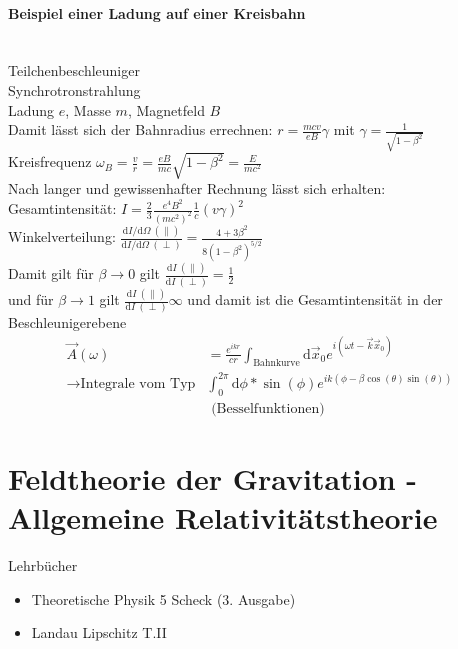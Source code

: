 \documentclass[a4paper]{article}
\begin{document}
\paragraph{Beispiel einer Ladung auf einer Kreisbahn}~\\
Teilchenbeschleuniger\\
Synchrotronstrahlung\\
Ladung $e$, Masse $m$, Magnetfeld $B$\\
Damit lässt sich der Bahnradius errechnen: $r=\frac{mcv}{eB}\gamma$ mit
$\gamma=\frac{1}{\sqrt{1-\beta^2}}$\\
Kreisfrequenz
$\omega_B=\frac{v}{r}=\frac{eB}{mc}\sqrt{1-\beta^2}=\frac{E}{mc^2}$\\
Nach langer und gewissenhafter Rechnung lässt sich erhalten:\\
Gesamtintensität: 
$I=\frac{2}{3}\frac{e^4B^2}{(mc^2)^2}\frac{1}{c}\left(v\gamma\right)^2$\\
Winkelverteilung: $\frac{\mathrm{d}I/\mathrm{d}\Omega\
(\parallel)}{\mathrm{d}I/\mathrm{d}\Omega\
(\perp)}=\frac{4+3\beta^2}{8(1-\beta^2)^{5/2}}$\\
Damit gilt für $\beta\rightarrow0$ gilt $\frac{\mathrm{d}I\
(\parallel)}{\mathrm{d}I \ (\perp)}=\frac{1}{2}$\\
und für $\beta\rightarrow1$ gilt $\frac{\mathrm{d}I\
(\parallel)}{\mathrm{d}I \ (\perp)}\infty$ und damit ist die Gesamtintensität in
der Beschleunigerebene
\begin{align}
\vec{A}(\omega)&=\frac{e^{ikr}}{cr}\int_{\text{Bahnkurve}}\mathrm{d}\vec{x}_0
e^{i(\omega t-\vec{k}\vec{x}_0)}\\
\rightarrow \text{Integrale vom Typ} &\int_0^{2\pi}\mathrm{d}\phi*\sin(\phi)
e^{ik(\phi-\beta \cos(\theta)\sin(\theta))}\\&\text{  (Besselfunktionen)}
\end{align}

\section{Feldtheorie der Gravitation - Allgemeine Relativitätstheorie}
Lehrbücher
\begin{itemize}
  \item Theoretische Physik 5 Scheck (3. Ausgabe)
  \item Landau Lipschitz T.II 
\end{itemize}
\end{document}
